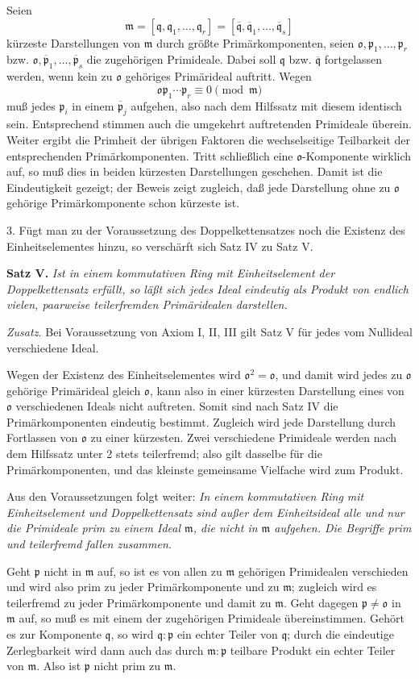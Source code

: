 \documentclass[11pt]{article}
\providecommand{\mm}{\mathfrak{m}}
\providecommand{\mo}{\mathfrak{o}}
\providecommand{\mpideal}{\mathfrak{p}}
\providecommand{\mq}{\mathfrak{q}}
\providecommand{\mbar}[1]{\overline{#1}}
\begin{document}
Seien
\[
\mm=[\mq,\mq_1,\ldots,\mq_r]=[\mbar\mq,\mbar\mq_1,\ldots,\mbar\mq_s]
\]
kürzeste Darstellungen von $\mm$ durch größte Primärkomponenten, seien $\mo,\mpideal_1,\ldots,\mpideal_r$ bzw. $\mo,\mbar\mpideal_1,\ldots,\mbar\mpideal_s$ die zugehörigen Primideale. Dabei soll $\mq$ bzw. $\mbar\mq$ fortgelassen werden, wenn kein zu $\mo$ gehöriges Primärideal auftritt. Wegen
\[
\mo\mpideal_1\cdots\mpideal_r\equiv0\pmod{\mm}
\]
muß jedes $\mpideal_i$ in einem $\mbar\mpideal_j$ aufgehen, also nach dem Hilfssatz mit diesem identisch sein. Entsprechend stimmen auch die umgekehrt auftretenden Primideale überein. Weiter ergibt die Primheit der übrigen Faktoren die wechselseitige Teilbarkeit der entsprechenden Primärkomponenten. Tritt schließlich eine $\mo$-Komponente wirklich auf, so muß dies in beiden kürzesten Darstellungen geschehen. Damit ist die Eindeutigkeit gezeigt; der Beweis zeigt zugleich, daß jede Darstellung ohne zu $\mo$ gehörige Primärkomponente schon kürzeste ist.

3. Fügt man zu der Voraussetzung des Doppelkettensatzes noch die Existenz des Einheitselementes hinzu, so verschärft sich Satz IV zu Satz V.

\textbf{Satz V.} \emph{Ist in einem kommutativen Ring mit Einheitselement der Doppelkettensatz erfüllt, so läßt sich jedes Ideal eindeutig als Produkt von endlich vielen, paarweise teilerfremden Primäridealen darstellen.}

\emph{Zusatz.} Bei Voraussetzung von Axiom I, II, III gilt Satz V für jedes vom Nullideal verschiedene Ideal.

Wegen der Existenz des Einheitselementes wird $\mo^2=\mo$, und damit wird jedes zu $\mo$ gehörige Primärideal gleich $\mo$, kann also in einer kürzesten Darstellung eines von $\mo$ verschiedenen Ideals nicht auftreten. Somit sind nach Satz IV die Primärkomponenten eindeutig bestimmt. Zugleich wird jede Darstellung durch Fortlassen von $\mo$ zu einer kürzesten. Zwei verschiedene Primideale werden nach dem Hilfssatz unter 2 stets teilerfremd; also gilt dasselbe für die Primärkomponenten, und das kleinste gemeinsame Vielfache wird zum Produkt.

Aus den Voraussetzungen folgt weiter: \emph{In einem kommutativen Ring mit Einheitselement und Doppelkettensatz sind außer dem Einheitsideal alle und nur die Primideale prim zu einem Ideal $\mm$, die nicht in $\mm$ aufgehen. Die Begriffe prim und teilerfremd fallen zusammen.}

Geht $\mpideal$ nicht in $\mm$ auf, so ist es von allen zu $\mm$ gehörigen Primidealen verschieden und wird also prim zu jeder Primärkomponente und zu $\mm$; zugleich wird es teilerfremd zu jeder Primärkomponente und damit zu $\mm$. Geht dagegen $\mpideal\ne\mo$ in $\mm$ auf, so muß es mit einem der zugehörigen Primideale übereinstimmen. Gehört es zur Komponente $\mq$, so wird $\mq:\mpideal$ ein echter Teiler von $\mq$; durch die eindeutige Zerlegbarkeit wird dann auch das durch $\mm:\mpideal$ teilbare Produkt ein echter Teiler von $\mm$. Also ist $\mpideal$ nicht prim zu $\mm$.
\end{document}
